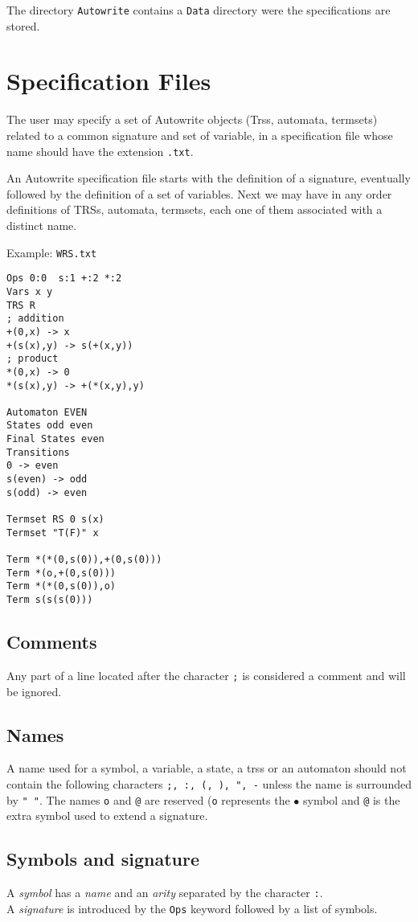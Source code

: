 \documentclass[11pt]{llncs}
\begin{document}
The directory {\tt Autowrite} contains a {\tt Data} directory were
the specifications are stored. 

\section{Specification Files}
The user may specify a set of Autowrite objects (Trss, automata, termsets)
related to a common signature and set of variable, in a specification file whose name 
should have the extension \texttt{.txt}.

An Autowrite specification file starts with the definition
of a signature, eventually followed by the definition of a set of variables.
Next we may have in any order definitions of TRSs, automata, termsets,
each one of them associated with a distinct name.

\pagebreak
\noindent
Example: \texttt{WRS.txt}
\begin{verbatim}
Ops 0:0  s:1 +:2 *:2
Vars x y
TRS R
; addition
+(0,x) -> x
+(s(x),y) -> s(+(x,y))
; product
*(0,x) -> 0
*(s(x),y) -> +(*(x,y),y)

Automaton EVEN
States odd even
Final States even
Transitions
0 -> even
s(even) -> odd
s(odd) -> even

Termset RS 0 s(x)
Termset "T(F)" x

Term *(*(0,s(0)),+(0,s(0)))
Term *(o,+(0,s(0)))
Term *(*(0,s(0)),o)
Term s(s(s(0)))
\end{verbatim}


\subsection{Comments}
Any part of a line located after the character \texttt{;} 
is considered a comment and will be ignored.

\subsection{Names}
A name used for a symbol, a variable, a state, a trss or an automaton
should not contain the following characters \texttt{;, :, (, ), ", -}
unless the name is surrounded by \texttt{" "}.
The names \texttt{o} and \texttt{@} are reserved (\texttt{o} represents
the $\bullet$ symbol and \texttt{@} is the extra symbol used to extend
a signature.

\subsection{Symbols and signature}
A \emph{symbol} has a \emph{name} and an \emph{arity}
 separated by the character \texttt{:}.\\
A \emph{signature} is introduced by the \texttt{Ops} keyword followed by
a list of symbols.\\
\end{document}
